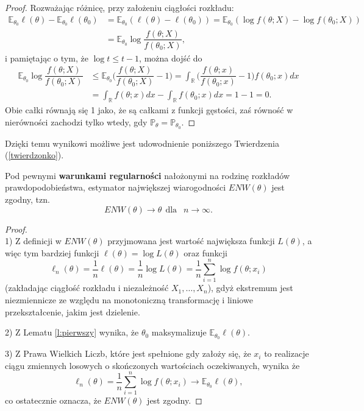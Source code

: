 \begin{proof}
Rozważając różnicę, przy założeniu ciągłości rozkładu:
\begin{equation*}
\begin{split}
\mathbb{E}_{\theta_0}\ell(\theta) - \mathbb{E}_{\theta_0}\ell(\theta_0) & = \mathbb{E}_{\theta_0}(\ell(\theta) - \ell(\theta_0) ) = \mathbb{E}_{\theta_0}(\log f(\theta; X) - \log f(\theta_0; X)) \\
 & = \mathbb{E}_{\theta_0}\log\dfrac{f(\theta; X)}{f(\theta_0; X)},
\end{split}
\end{equation*}
i pamiętając o tym, że $\log t \leq t - 1$, można dojść do
\begin{equation*}
\begin{split}
\mathbb{E}_{\theta_0}\log\dfrac{f(\theta; X)}{f(\theta_0; X)} & \leq \mathbb{E}_{\theta_0}\Big(\dfrac{f(\theta; X)}{f(\theta_0; X)} - 1 \Big) = \int_{\mathbb{R}} \Big(\dfrac{f(\theta; x)}{f(\theta_0; x)} - 1 \Big) f(\theta_0;x) dx \\ 
& = \int_{\mathbb{R}} f(\theta;x)dx - \int_{\mathbb{R}} f(\theta_0;x)dx = 1-1 =0.
\end{split}
\end{equation*}
Obie całki równają się 1 jako, że są całkami z funkcji gęstości, zaś równość w nierówności zachodzi tylko wtedy, gdy  $\mathbb{P}_{\theta}=\mathbb{P}_{\theta_0}$.
\end{proof}

Dzięki temu wynikowi możliwe jest udowodnienie poniższego Twierdzenia (\ref{twierdzonko}).

\begin{theorem}\label{twierdzonko}
Pod pewnymi \textbf{warunkami regularności} nałożonymi na rodzinę rozkładów prawdopodobieństwa, estymator największej wiarogodności $ENW(\theta)$ jest zgodny, tzn. 
$$ENW(\theta) \rightarrow \theta \ \ \text{dla } \ \ n \rightarrow \infty.$$
\end{theorem}
\begin{proof}
\ \\
1) Z definicji w $ENW(\theta)$ przyjmowana jest wartość największa funkcji $L(\theta)$, a więc tym bardziej funkcji $ \ell(\theta) = \log L(\theta)$ oraz funkcji $$ \ell_n(\theta) = \frac{1}{n}\ell(\theta) = \frac{1}{n}\log L(\theta) = \frac{1}{n}\sum\limits_{i=1}^{n}\log f(\theta;x_i)$$ (zakładając ciągłość rozkładu i niezależność $X_1,\dots,X_n$), gdyż ekstremum jest niezmiennicze ze względu na monotoniczną transformację i liniowe przekształcenie, jakim jest dzielenie.

2) Z Lematu \ref{l:pierwszy} wynika, że $\theta_0$ maksymalizuje $\mathbb{E}_{\theta_0}\ell(\theta)$.

3) Z Prawa Wielkich Liczb, które jest spełnione gdy założy się, że $x_i$ to realizacje ciągu zmiennych losowych o skończonych wartościach oczekiwanych, wynika że $$ \ell_n(\theta) = \frac{1}{n}\sum\limits_{i=1}^{n}\log f(\theta;x_i) \rightarrow \mathbb{E}_{\theta_0}\ell(\theta),$$ co ostatecznie oznacza, że $ENW(\theta)$ jest zgodny.
\end{proof}

